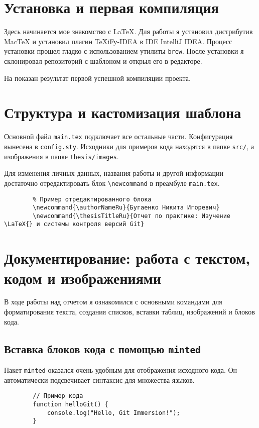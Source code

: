 \section{Установка и первая компиляция}\label{sec:---}
Здесь начинается мое знакомство с \LaTeX{}.
Для работы я установил дистрибутив MacTeX и установил плагин TeXiFy-IDEA в IDE IntelliJ IDEA\@.
Процесс установки прошел гладко с использованием утилиты \texttt{brew}.
После установки я склонировал репозиторий с шаблоном и открыл его в редакторе.

На  показан результат первой успешной компиляции проекта.

\label{fig:first_compile}


\section{Структура и кастомизация шаблона}\label{sec:---2}
Основной файл \texttt{main.tex} подключает все остальные части.
Конфигурация вынесена в \texttt{config.sty}.
Исходники для примеров кода находятся в папке \texttt{src/}, а изображения в папке \texttt{thesis/images}.

Для изменения личных данных, названия работы и другой информации достаточно отредактировать блок \texttt{\textbackslash newcommand} в преамбуле \texttt{main.tex}.
\begin{verbatim}
        % Пример отредактированного блока
        \newcommand{\authorNameRu}{Бугаенко Никита Игоревич}
        \newcommand{\thesisTitleRu}{Отчет по практике: Изучение \LaTeX{} и системы контроля версий Git}
\end{verbatim}


\section{Документирование: работа с текстом, кодом и изображениями}\label{sec::------}
В ходе работы над отчетом я ознакомился с основными командами для форматирования текста, создания списков, вставки таблиц, изображений и блоков кода.

\subsection{Вставка блоков кода с помощью \texttt{minted}}\label{subsec:-----texttt{minted}}
Пакет \texttt{minted} оказался очень удобным для отображения исходного кода.
Он автоматически подсвечивает синтаксис для множества языков.
\begin{verbatim}
        // Пример кода
        function helloGit() {
            console.log("Hello, Git Immersion!");
        }
\end{verbatim}

